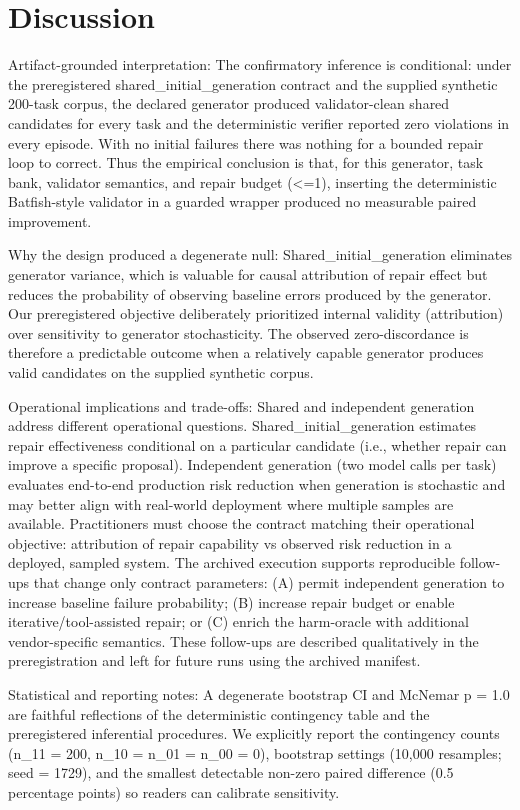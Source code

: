 \documentclass[conference]{IEEEtran}
\begin{document}
\section{Discussion}
Artifact-grounded interpretation: The confirmatory inference is conditional: under the preregistered shared\_initial\_generation contract and the supplied synthetic 200-task corpus, the declared generator produced validator-clean shared candidates for every task and the deterministic verifier reported zero violations in every episode. With no initial failures there was nothing for a bounded repair loop to correct. Thus the empirical conclusion is that, for this generator, task bank, validator semantics, and repair budget (<=1), inserting the deterministic Batfish-style validator in a guarded wrapper produced no measurable paired improvement.

Why the design produced a degenerate null: Shared\_initial\_generation eliminates generator variance, which is valuable for causal attribution of repair effect but reduces the probability of observing baseline errors produced by the generator. Our preregistered objective deliberately prioritized internal validity (attribution) over sensitivity to generator stochasticity. The observed zero-discordance is therefore a predictable outcome when a relatively capable generator produces valid candidates on the supplied synthetic corpus.

Operational implications and trade-offs: Shared and independent generation address different operational questions. Shared\_initial\_generation estimates repair effectiveness conditional on a particular candidate (i.e., whether repair can improve a specific proposal). Independent generation (two model calls per task) evaluates end-to-end production risk reduction when generation is stochastic and may better align with real-world deployment where multiple samples are available. Practitioners must choose the contract matching their operational objective: attribution of repair capability vs observed risk reduction in a deployed, sampled system. The archived execution supports reproducible follow-ups that change only contract parameters: (A) permit independent generation to increase baseline failure probability; (B) increase repair budget or enable iterative/tool-assisted repair; or (C) enrich the harm-oracle with additional vendor-specific semantics. These follow-ups are described qualitatively in the preregistration and left for future runs using the archived manifest.

Statistical and reporting notes: A degenerate bootstrap CI and McNemar p = 1.0 are faithful reflections of the deterministic contingency table and the preregistered inferential procedures. We explicitly report the contingency counts (n\_11 = 200, n\_10 = n\_01 = n\_00 = 0), bootstrap settings (10,000 resamples; seed = 1729), and the smallest detectable non-zero paired difference (0.5 percentage points) so readers can calibrate sensitivity.
\end{document}
